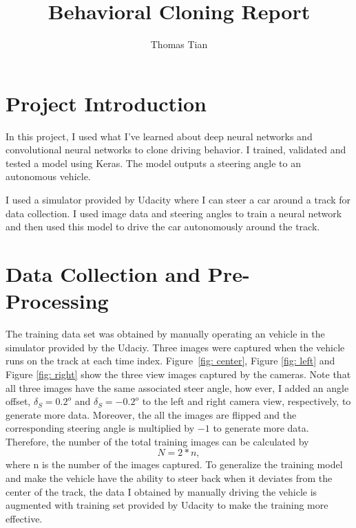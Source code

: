\documentclass{article}
\begin{document}
\pagestyle{fancyplain}


\title{\textbf{Behavioral Cloning Report}}
\author{Thomas Tian}

\maketitle


\section{Project Introduction}

In this project, I used what I've learned about deep neural networks and convolutional neural networks to clone driving behavior. I trained, validated and tested a model using Keras. The model outputs a steering angle to an autonomous vehicle.

I used a simulator provided by Udacity where I can steer a car around a track for data collection. I used image data and steering angles to train a neural network and then used this model to drive the car autonomously around the track.

\section{Data Collection and Pre-Processing}

The training data set was obtained by manually operating an vehicle in the simulator provided by the Udaciy. Three images were captured when the vehicle runs on the track at each time index. Figure~\ref{fig: center}, Figure \ref{fig: left} and Figure \ref{fig: right} show the three view images captured by the cameras. Note that all three images have the same associated steer angle, how ever, I added an angle offset, $\delta_S = 0.2 ^o$ and $\delta_S = -0.2 ^o$ to the left and right camera view, respectively, to generate more data. Moreover, the all the images are flipped and the corresponding steering angle is multiplied by $-1$ to generate more data. Therefore, the number of the total training images can be calculated by
\begin{equation}
N = 2*n,
\end{equation}   
where n is the number of the images captured. To generalize the training model and make the vehicle have the ability to steer back when it deviates from the center of the track, the data I obtained by manually driving the vehicle is augmented with training set provided by Udacity to make the training more effective. 
\end{document}

